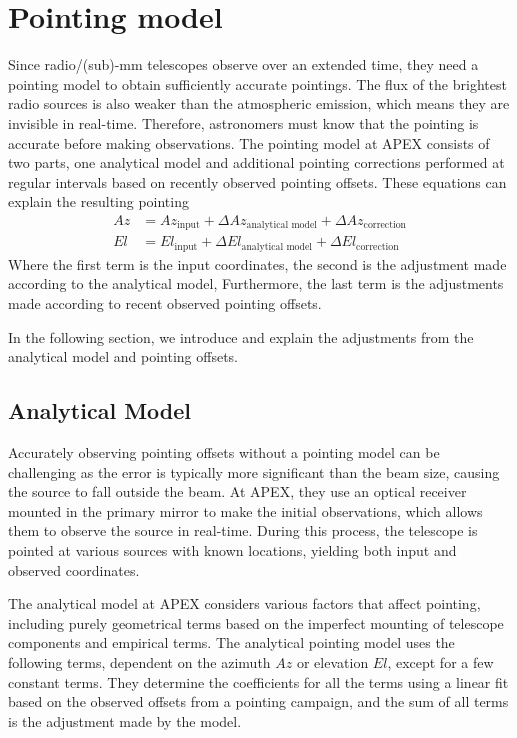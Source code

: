\section{Pointing model}\label{sec:pt_model}
Since radio/(sub)-mm telescopes observe over an extended time, they need a pointing model to obtain sufficiently accurate pointings.
The flux of the brightest radio sources is also weaker than the atmospheric emission, which means they are invisible in real-time.
Therefore, astronomers must know that the pointing is accurate before making observations.
The pointing model at APEX consists of two parts, one analytical model and additional pointing corrections performed at regular intervals based on recently observed pointing offsets.
These equations can explain the resulting pointing
\begin{align}
    Az &= Az_\text{input} + \Delta Az_\text{analytical model} + \Delta Az_\text{correction} \\ 
    El &= El_\text{input} + \Delta El_\text{analytical model} + \Delta El_\text{correction}
\end{align}
Where the first term is the input coordinates, the second is the adjustment made according to the analytical model,
Furthermore, the last term is the adjustments made according to recent observed pointing offsets.

In the following section, we introduce and explain the adjustments from the analytical model and pointing offsets. 


\subsection{Analytical Model}

Accurately observing pointing offsets without a pointing model can be challenging as the error is typically more significant than the beam size, causing the source to fall outside the beam. At APEX,  they use an optical receiver mounted in the primary mirror to make the initial observations, which allows them to observe the source in real-time.
During this process, the telescope is pointed at various sources with known locations, yielding both input and observed coordinates.

The analytical model at APEX considers various factors that affect pointing, including purely geometrical terms based on the imperfect mounting of telescope components and empirical terms.
The analytical pointing model uses the following terms, dependent on the azimuth $Az$ or elevation $El$, except for a few constant terms.
They determine the coefficients for all the terms using a linear fit based on the observed offsets from a pointing campaign, and the sum of all terms is the adjustment made by the model.

